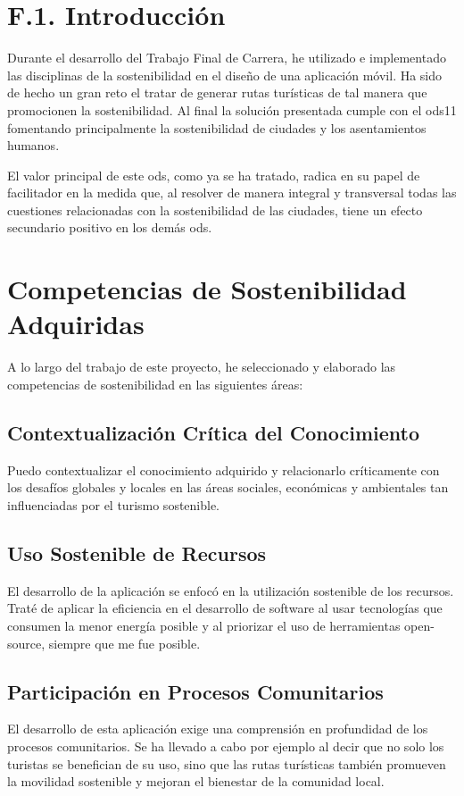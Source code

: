 
\section{F.1. Introducción}
Durante el desarrollo del Trabajo Final de Carrera, he utilizado e implementado las disciplinas de la sostenibilidad en el diseño de una aplicación móvil. Ha sido de hecho un gran reto el tratar de generar rutas turísticas de tal manera que promocionen la sostenibilidad. Al final la solución presentada cumple con el \acrfull{ods11} fomentando principalmente la sostenibilidad de ciudades y los asentamientos humanos.

El valor principal de este \acrfull{ods}, como ya se ha tratado, radica en su papel de facilitador en la medida que, al resolver de manera integral y transversal todas las cuestiones relacionadas con la sostenibilidad de las ciudades, tiene un efecto secundario positivo en los demás \acrshort{ods}.

\section{Competencias de Sostenibilidad Adquiridas}
A lo largo del trabajo de este proyecto, he seleccionado y elaborado las competencias de sostenibilidad en las siguientes áreas:
	
	\subsection{Contextualización Crítica del Conocimiento}
	Puedo contextualizar el conocimiento adquirido y relacionarlo críticamente con los desafíos globales y locales en las áreas sociales, económicas y ambientales tan influenciadas por el turismo sostenible.
		
	\subsection{Uso Sostenible de Recursos}
	El desarrollo de la aplicación se enfocó en la utilización sostenible de los recursos. Traté de aplicar la eficiencia en el desarrollo de software al usar tecnologías que consumen la menor energía posible y al priorizar el uso de herramientas open-source, siempre que me fue posible.
		
	\subsection{Participación en Procesos Comunitarios}
	El desarrollo de esta aplicación exige una comprensión en profundidad de los procesos comunitarios. Se ha llevado a cabo por ejemplo al decir que no solo los turistas se benefician de su uso, sino que las rutas turísticas también promueven la movilidad sostenible y mejoran el bienestar de la comunidad local.
			

